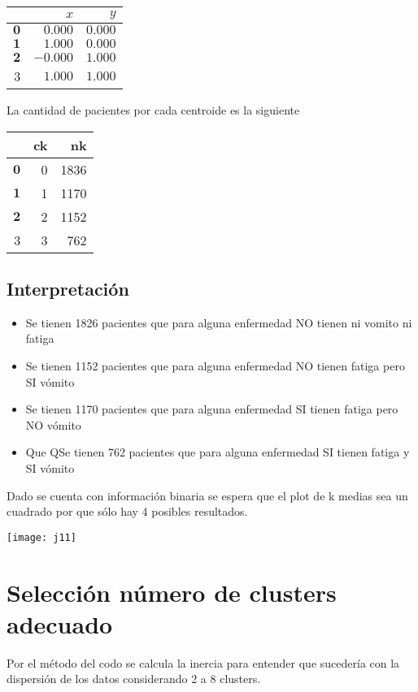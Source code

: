 \documentclass[twocolumn]{bmcart}%
\begin{document}
\begin{tabular}{rrr} 
& $x$ & $y$ \\
\hline $\mathbf{0}$ & $0.000$ & $0.000$ \\
$\mathbf{1}$ & $1.000$ & $0.000$ \\
$\mathbf{2}$ & $-0.000$ & $1.000$ \\
3 & $1.000$ & $1.000$
\end{tabular}



La cantidad de pacientes por cada centroide es la siguiente

\begin{tabular}{rrr} 
& ck & nk \\
\hline $\mathbf{0}$ & 0 & 1836 \\
$\mathbf{1}$ & 1 & 1170 \\
$\mathbf{2}$ & 2 & 1152 \\
3 & 3 & 762
\end{tabular}



\subsection*{Interpretación}

\begin{itemize}
    \item Se tienen 1826 pacientes que para alguna enfermedad NO tienen ni vomito ni fatiga
    \item Se tienen 1152 pacientes que para alguna enfermedad NO tienen fatiga pero SI vómito
    \item Se tienen 1170 pacientes que para alguna enfermedad SI tienen fatiga pero NO vómito
\item Que QSe tienen 762 pacientes que para alguna enfermedad SI tienen fatiga y SI vómito
\end{itemize} 

Dado se cuenta con información binaria se espera que el plot de k medias sea un cuadrado por que sólo hay 4 posibles resultados.

\texttt{[image: j11]}

\section*{Selección número de clusters adecuado}
Por el método del codo se calcula la inercia para entender que sucedería con la dispersión de los datos considerando 2 a 8 clusters.
\end{document}
